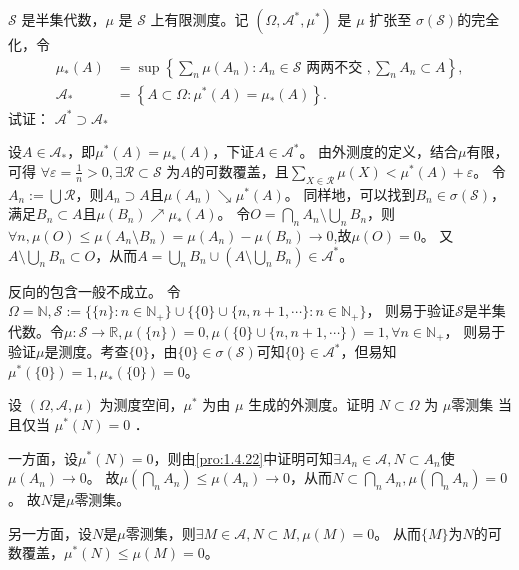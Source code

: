 \documentclass{ctexart}
\begin{document}
\begin{problem}\label{pro:1.4.22}
  $\mathscr{S}$ 是半集代数，$\mu$ 是 $\mathscr{S}$ 上有限测度。记 $\left(\Omega, \mathscr{A}^*, \mu^*\right)$ 是 $\mu$ 扩张至 $\sigma(\mathscr{S})$的完全化，令
  $$
  \begin{aligned}
    \mu_*(A) & =\sup \left\{\sum_n \mu\left(A_n\right): A_n \in \mathscr{S} \text { 两两不交 },\sum_n A_n \subset A\right\}, \\
    \mathscr{A}_* & =\left\{A \subset \Omega: \mu^*(A)=\mu_*(A)\right\} .
  \end{aligned}
  $$
  试证： \(\mathscr{A}^* \supset \mathscr{A}_*\)
\end{problem}
\begin{solution}
  设\(A \in \mathcal{A}_{*} \)，即\(\mu^{*}(A)=\mu_{*}(A) \)，下证\(A \in \mathcal{A}^* \)。
  由外测度的定义，结合\(\mu \)有限，可得 \(\forall \varepsilon =\frac{1}{n} >0,\exists \mathcal{R} \subset \mathscr{S} \)  为\(A \)的可数覆盖，且\(\sum_{X \in \mathcal{R}}\mu(X) < \mu^*(A) + \varepsilon \)。
  令\(A_n := \bigcup \mathcal{R} \)，则\(A_n \supset A \)且\(\mu(A_n)\searrow \mu^*(A) \)。
  同样地，可以找到\(B_n \in \sigma(\mathscr{S}) \)，满足\(B_n \subset A \)且\(\mu(B_n) \nearrow \mu_*(A) \)。
  令\(O=\bigcap_{n}A_n \setminus \bigcup_{n} B_n \)，则\(\forall n, \mu(O) \leq \mu(A_n \setminus B_n)=\mu(A_n)-\mu(B_n) \to 0 \),故\(\mu(O)=0 \)。
  又\(A \setminus \bigcup_{n}B_n \subset O\)，从而\(A=\bigcup_{n}B_n \cup (A \setminus \bigcup_{n}B_n) \in \mathcal{A}^* \)。
\end{solution}
\begin{remark}
  反向的包含一般不成立。
  令\(\Omega=\mathbb{N},\mathscr{S}:=\{\{n\}:n \in \mathbb{N}_{+}\}\cup \{\{0\}\cup \{n,n+1,\cdots\}:n \in \mathbb{N}_{+}\} \)，
  则易于验证\(\mathscr{S} \)是半集代数。令\(\mu:\mathscr{S} \to \mathbb{R},\mu(\{n\})=0,\mu(\{0\}\cup\{n,n+1,\cdots\})=1 ,\forall n \in \mathbb{N}_{+}\)，
  则易于验证\(\mu \)是测度。考查\(\{0\} \)，由\(\{0\} \in \sigma(\mathscr{S}) \)可知\(\{0\} \in \mathcal{A}^* \)，但易知\(\mu^*(\{0\})=1,\mu_{*}(\{0\})=0 \)。
\end{remark}

\begin{problem}\label{pro:1.4.23}
  设 $(\Omega, \mathscr{A}, \mu)$ 为测度空间，$\mu^*$ 为由 $\mu$ 生成的外测度。证明 $N \subset \Omega$ 为 $\mu$零测集
  当且仅当 $\mu^*(N)=0$ ．
\end{problem}

\begin{solution}
  一方面，设\(\mu^*(N)=0 \)，则由\ref{pro:1.4.22}中证明可知\(\exists A_n \in \mathcal{A} ,N \subset A_n\)使\(\mu(A_n) \to 0 \)。
  故\(\mu(\bigcap_{n}A_n) \leq \mu(A_n) \to 0 \)，从而\(N \subset \bigcap_{n}A_n,\mu(\bigcap_{n}A_n)=0 \)。
  故\(N \)是\(\mu \)零测集。

  另一方面，设\(N\)是\(\mu \)零测集，则\(\exists M \in \mathcal{A},N \subset M,\mu(M)=0 \)。
  从而\(\{M\} \)为\(N \)的可数覆盖，\(\mu^*(N) \leq \mu(M)=0 \)。
\end{solution}
\end{document}
